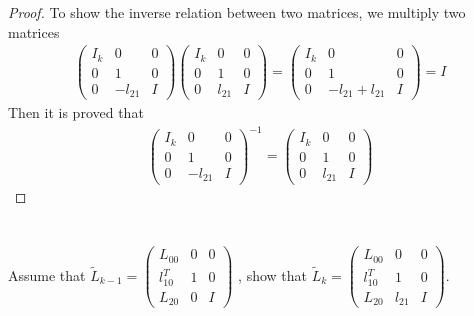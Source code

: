 \documentclass[11pt,a4paper]{article}
\begin{document}
\begin{proof}
    To show the inverse relation between two matrices, we multiply two matrices 
    \begin{align}
        \left( \begin{array}{c|c|c} 
            I_k & 0 & 0 \\ \hline 0 & 1 & 0 \\ \hline 0 & -l_{21} & I
        \end{array} \right)
    \left( \begin{array}{c|c|c} 
            I_k & 0 & 0 \\ \hline 0 & 1 & 0 \\ \hline 0 & l_{21} & I
        \end{array} \right)
    = 
    \left( \begin{array}{c|c|c} 
            I_k & 0 & 0 \\ \hline 0 & 1 & 0 \\ \hline 0 & -l_{21} + l_{21} & I 
        \end{array} \right)
    = I
    \end{align}
    Then it is proved that 
\begin{align}
    \left( \begin{array}{c|c|c} 
            I_k & 0 & 0 \\ \hline 0 & 1 & 0 \\ \hline 0 & -l_{21} & I
        \end{array} \right)^{-1}
    =
    \left( \begin{array}{c|c|c} 
            I_k & 0 & 0 \\ \hline 0 & 1 & 0 \\ \hline 0 & l_{21} & I
        \end{array} \right)
\end{align}
\end{proof}
\setcounter{section}{6}
\newcommand{\Lt}{\tilde{L}}
\section{}
Assume that 
$ \Lt_{k-1} = 
       \left( \begin{array}{c|c|c} 
               L_{00} & 0 & 0 \\ \hline 
               l_{10}^T & 1 & 0 \\ \hline
               L_{20} & 0 & I
        \end{array} \right)
$
, show that 
$ \Lt_{k} = 
       \left( \begin{array}{c|c|c} 
               L_{00} & 0 & 0 \\ \hline 
               l_{10}^T & 1 & 0 \\ \hline
               L_{20} & l_{21} & I
        \end{array} \right)
$.
\end{document}
